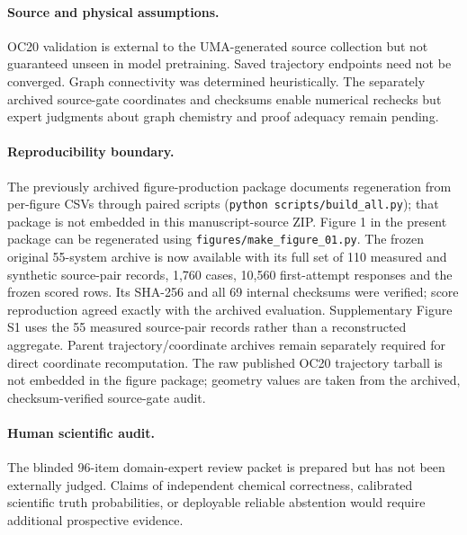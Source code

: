 \documentclass[11pt]{article}
\begin{document}
\paragraph{Source and physical assumptions.} OC20 validation is external to the UMA-generated source collection but not guaranteed unseen in model pretraining. Saved trajectory endpoints need not be converged. Graph connectivity was determined heuristically. The separately archived source-gate coordinates and checksums enable numerical rechecks but expert judgments about graph chemistry and proof adequacy remain pending.
\paragraph{Reproducibility boundary.} The previously archived figure-production package documents regeneration from per-figure CSVs through paired scripts (\texttt{python scripts/build\_all.py}); that package is not embedded in this manuscript-source ZIP. Figure 1 in the present package can be regenerated using \texttt{figures/make\_figure\_01.py}. The frozen original 55-system archive is now available with its full set of 110 measured and synthetic source-pair records, 1,760 cases, 10,560 first-attempt responses and the frozen scored rows. Its SHA-256 and all 69 internal checksums were verified; score reproduction agreed exactly with the archived evaluation. Supplementary Figure S1 uses the 55 measured source-pair records rather than a reconstructed aggregate. Parent trajectory/coordinate archives remain separately required for direct coordinate recomputation. The raw published OC20 trajectory tarball is not embedded in the figure package; geometry values are taken from the archived, checksum-verified source-gate audit.
\paragraph{Human scientific audit.} The blinded 96-item domain-expert review packet is prepared but has not been externally judged. Claims of independent chemical correctness, calibrated scientific truth probabilities, or deployable reliable abstention would require additional prospective evidence.

\printbibliography
\end{document}
